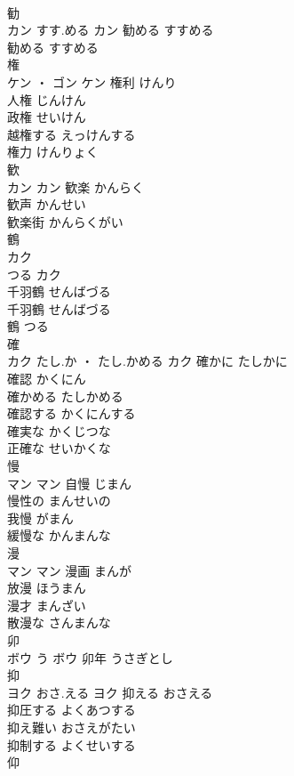 \documentclass[8pt]{extreport}
\begin{document}
\begin{CJK}{UTF8}{min}
\\	勧	
\\	カン	すす.める	カン	勧める	すすめる	
\\	勧める	すすめる	
\\	権	
\\	ケン ・ ゴン		ケン	権利	けんり	
\\	人権	じんけん	
\\	政権	せいけん	
\\	越権する	えっけんする	
\\	権力	けんりょく	
\\	歓	
\\	カン		カン	歓楽	かんらく	
\\	歓声	かんせい	
\\	歓楽街	かんらくがい	
\\	鶴	
\\	カク
\\	つる	カク
\\	千羽鶴	せんばづる	
\\	千羽鶴	せんばづる	
\\	鶴	つる	
\\	確	
\\	カク	たし.か ・ たし.かめる	カク	確かに	たしかに	
\\	確認	かくにん	
\\	確かめる	たしかめる	
\\	確認する	かくにんする	
\\	確実な	かくじつな	
\\	正確な	せいかくな	
\\	慢	
\\	マン		マン	自慢	じまん	
\\	慢性の	まんせいの	
\\	我慢	がまん	
\\	緩慢な	かんまんな	
\\	漫	
\\	マン		マン	漫画	まんが	
\\	放漫	ほうまん	
\\	漫才	まんざい	
\\	散漫な	さんまんな	
\\	卯	
\\	ボウ	う	ボウ	卯年	うさぎとし	
\\	抑	
\\	ヨク	おさ.える	ヨク	抑える	おさえる	
\\	抑圧する	よくあつする	
\\	抑え難い	おさえがたい	
\\	抑制する	よくせいする	
\\	仰	

\end{CJK}
\end{document}
